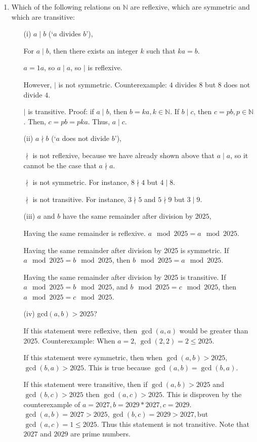 \documentclass[11pt]{article}
\begin{document}
\begin{enumerate}
\item
Which of the following relations on $\mathbb{N}$ are reflexive, which are symmetric and which are transitive:
\begin{itemize}
\item[(i)] $a \mid b$ (`$a$ divides $b$'),

\bigskip
For $a \mid b$, then there exists an integer $k$ such that $ka = b$.

\medskip
$a = 1a$, so $a \mid a$, so $\mid$ is reflexive. 

\medskip 
However, $\mid$ is not symmetric. Counterexample: $4$ divides $8$ but $8$ does not divide $4$. 

\medskip $\mid$ is transitive. Proof: if $a \mid b$, then $b = ka, k\in \mathbb{N}$. If $b \mid c$, then $c = pb, p\in\mathbb{N}$. Then, $c = pb = pka$. Thus, $a \mid c$. 
\item[(ii)] $a \nmid b$ (`$a$ does not divide $b$'),

\bigskip $\nmid$ is not reflexive, because we have already shown above that $a \mid a$, so it cannot be the case that $a \nmid a$.

\medskip 
$\nmid$ is not symmetric. For instance, $8 \nmid 4$ but $4 \mid 8$. 

\medskip 
$\nmid $ is not transitive. For instance, $3 \nmid 5$ and $5\nmid 9$ but $3 \mid 9$. 


\item[(iii)] $a$ and $b$ have the same remainder after division by $2025$,

\bigskip
Having the same remainder is reflexive. $a\mod 2025 = a\mod 2025$.

\medskip
Having the same remainder after division by 2025 is symmetric. If $a \mod 2025 = b \mod 2025$, then $b \mod 2025 = a \mod 2025$.

\medskip
Having the same remainder after division by 2025 is transitive. If $a \mod 2025 = b \mod 2025$, and $b \mod 2025 = c \mod 2025$, then $a \mod 2025 = c \mod 2025$.
\item[(iv)] gcd$(a, b) > 2025$?

\bigskip
If this statement were reflexive, then $\gcd(a,a)$ would be greater than 2025. Counterexample: When $a = 2$, $\gcd(2,2) = 2 \leq 2025$. 

If this statement were symmetric, then when $\gcd(a,b) > 2025$, $\gcd(b,a) > 2025$. This is true because $\gcd(a,b) = \gcd(b,a)$. 

If this statement were transitive, then if $\gcd(a,b) > 2025 $ and $\gcd(b,c) > 2025$ then $\gcd(a,c) > 2025$. This is disproven by the counterexample of $a = 2027, b = 2029*2027, c = 2029$. $\gcd(a,b) = 2027 > 2025, \gcd(b,c) = 2029 > 2027, $but$ \gcd(a,c) = 1 \leq 2025$. Thus this statement is not transitive. Note that $2027$ and $2029$ are prime numbers.
\end{itemize}

\end{enumerate}
\end{document}
